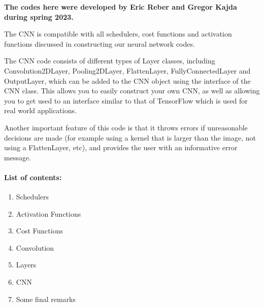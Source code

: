 \documentclass[%
oneside,                 %
final,                   %
10pt]{article}
\begin{document}
\textbf{The codes here were developed by Eric Reber and Gregor Kajda during spring 2023.}

The CNN is compatible with all schedulers, cost functions and
activation functions discussed in constructing our neural network
codes.

 The CNN code consists of different types of Layer classes, including
Convolution2DLayer, Pooling2DLayer, FlattenLayer, FullyConnectedLayer
and OutputLayer, which can be added to the CNN object using the
interface of the CNN class. This allows you to easily construct your
own CNN, as well as allowing you to get used to an interface similar
to that of TensorFlow which is used for real world applications. 

Another important feature of this code is that it throws errors if
unreasonable decisions are made (for example using a kernel that is
larger than the image, not using a FlattenLayer, etc), and provides
the user with an informative error message.

\paragraph{List of contents:}
\begin{enumerate}
\item Schedulers

\item Activation Functions

\item Cost Functions 

\item Convolution

\item Layers

\item CNN 

\item Some final remarks
\end{enumerate}

\noindent
\end{document}
